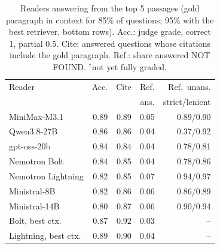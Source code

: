 \begin{table}[t]
\centering\small\setlength{\tabcolsep}{4pt}
\begin{tabular}{lrrrr}
\toprule
Reader & Acc. & Cite & Ref. & Ref.\ unans. \\
 & & & ans. & strict/lenient \\
\midrule
MiniMax-M3.1 & 0.89 & 0.89 & 0.05 & 0.89/0.90 \\
Qwen3.8-27B & 0.86 & 0.86 & 0.04 & 0.37/0.92 \\
gpt-oss-20b & 0.84 & 0.84 & 0.04 & 0.78/0.81 \\
Nemotron Bolt & 0.84 & 0.85 & 0.04 & 0.78/0.86 \\
Nemotron Lightning & 0.82 & 0.85 & 0.07 & 0.94/0.97 \\
Ministral-8B & 0.82 & 0.86 & 0.06 & 0.86/0.89 \\
Ministral-14B & 0.80 & 0.87 & 0.06 & 0.90/0.94 \\
\midrule
Bolt, best ctx. & 0.87 & 0.92 & 0.03 & -- \\
Lightning, best ctx. & 0.89 & 0.90 & 0.04 & -- \\
\bottomrule
\end{tabular}
\caption{Readers answering from the top 5 passages (gold paragraph in context for 85\% of questions; 95\%
with the best retriever, bottom rows). Acc.: judge grade, correct 1, partial 0.5. Cite: answered questions whose citations
include the gold paragraph. Ref.: share answered NOT FOUND. $^\dagger$not yet fully graded.}
\label{tab:readers}
\end{table}
